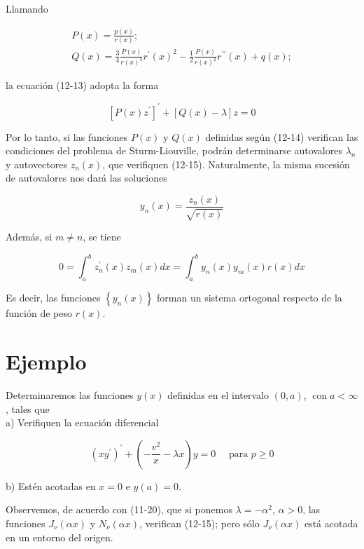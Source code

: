 \documentclass[10pt]{article}
\theoremstyle{plain}
\theoremstyle{definition}
\theoremstyle{remark}
\begin{document}
Llamando


\begin{gather*}
P(x)=\frac{p(x)}{r(x)} ; \\
Q(x)=\frac{3}{4} \frac{P(x)}{r(x)^{3}} r^{\prime}(x)^{2}-\frac{1}{2} \frac{P(x)}{r(x)^{2}} r^{\prime \prime}(x)+q(x) ; \tag{12-14}
\end{gather*}


la ecuación (12-13) adopta la forma


\begin{equation*}
\left[P(x) z^{\prime}\right]^{\prime}+[Q(x)-\lambda] z=0 \tag{12-15}
\end{equation*}



Por lo tanto, si las funciones $P(x)$ y $Q(x)$ definidas según (12-14) verifican las condiciones del problema de Sturm-Liouville, podrán determinarse autovalores $\lambda_{n}$ y autovectores $z_{n}(x)$, que verifiquen (12-15). Naturalmente, la misma sucesión de autovalores nos dará las soluciones


\begin{equation*}
y_{n}(x)=\frac{z_{n}(x)}{\sqrt{r(x)}} \tag{12-10}
\end{equation*}


Además, si $m \neq n$, se tiene

$$
0=\int_{a}^{b} z_{n}^{\prime}(x) z_{m}(x) d x=\int_{a}^{b} y_{n}(x) y_{m}(x) r(x) d x
$$

Es decir, las funciones $\left\{y_{n}(x)\right\}$ forman un sistema ortogonal respecto de la función de peso $r(x)$.

\section*{Ejemplo}
Determinaremos las funciones $y(x)$ definidas en el intervalo $(0, a)$, $\operatorname{con} a<\infty$, tales que\\
a) Verifiquen la ecuación diferencial


\begin{equation*}
\left(x y^{\prime}\right)^{\prime}+\left(-\frac{v^{2}}{x}-\lambda x\right) y=0 \quad \text { para } p \geqslant 0 \tag{12-16}
\end{equation*}


b) Estén acotadas en $x=0$ e $y(a)=0$.

Observemos, de acuerdo con (11-20), que si ponemos $\lambda=-\alpha^{2}$, $\alpha>0$, las funciones $J_{\nu}(\alpha x)$ y $N_{\nu}(\alpha x)$, verifican (12-15); pero sólo $J_{\nu}(\alpha x)$ está acotada en un entorno del origen.
\end{document}
